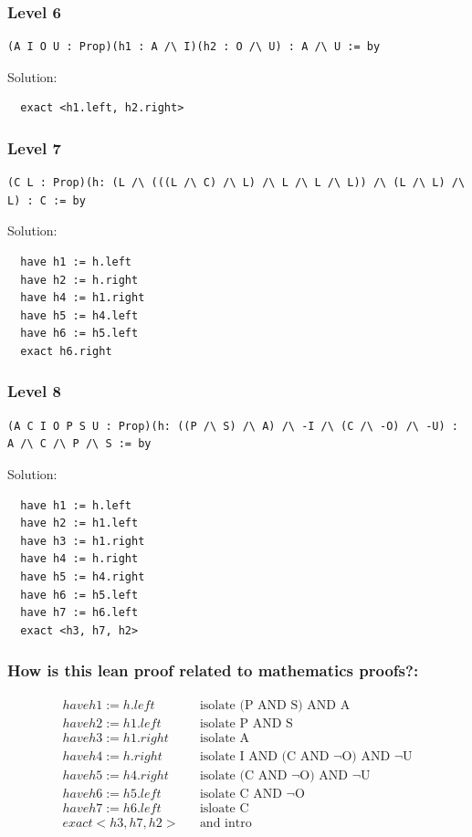 \documentclass{article}
\theoremstyle{theorem}
\theoremstyle{definition}
\theoremstyle{remark}
\begin{document}
\subsubsection*{Level 6}
\begin{lstlisting}
(A I O U : Prop)(h1 : A /\ I)(h2 : O /\ U) : A /\ U := by
\end{lstlisting}
Solution:
\begin{lstlisting}
  exact <h1.left, h2.right>
\end{lstlisting}
\subsubsection*{Level 7}
\begin{lstlisting}
(C L : Prop)(h: (L /\ (((L /\ C) /\ L) /\ L /\ L /\ L)) /\ (L /\ L) /\ L) : C := by
\end{lstlisting}
Solution:
\begin{lstlisting}
  have h1 := h.left
  have h2 := h.right
  have h4 := h1.right
  have h5 := h4.left
  have h6 := h5.left
  exact h6.right
\end{lstlisting}
\subsubsection*{Level 8}
\begin{lstlisting}
(A C I O P S U : Prop)(h: ((P /\ S) /\ A) /\ -I /\ (C /\ -O) /\ -U) : A /\ C /\ P /\ S := by
\end{lstlisting}
Solution:
\begin{lstlisting}
  have h1 := h.left
  have h2 := h1.left
  have h3 := h1.right
  have h4 := h.right
  have h5 := h4.right
  have h6 := h5.left
  have h7 := h6.left
  exact <h3, h7, h2>
\end{lstlisting}
\subsubsection*{How is this lean proof related to mathematics proofs?:}
\begin{align}
  have h1 := h.left   &      &\text{isolate  (P AND S) AND A} \\
  have h2 := h1.left   &      &\text{isolate P AND S} \\
  have h3 := h1.right        &      &\text{isolate A} \\
  have h4 := h.right&    &\text{isolate I AND (C AND ¬O) AND ¬U} \\
  have h5 := h4.right&      &\text{isolate (C AND ¬O) AND ¬U} \\
  have h6 := h5.left&      &\text{isolate C AND ¬O} \\
  have h7 := h6.left&      &\text{isloate C} \\
  exact <h3, h7, h2>&      &\text{and intro} \\
\end{align}
\end{document}
